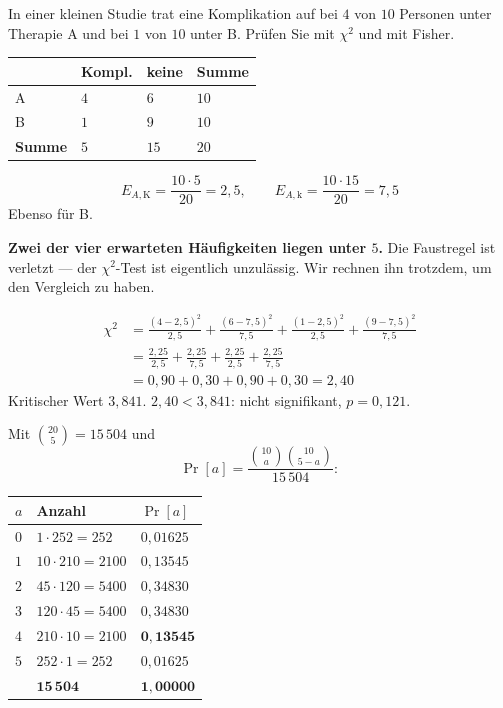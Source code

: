 \begin{aufgabe}
In einer kleinen Studie trat eine Komplikation auf bei $4$ von $10$ Personen unter Therapie A und bei $1$ von $10$ unter B. Prüfen Sie mit $\chi^2$ und mit Fisher.

\loesung
{}
\begin{center}
\renewcommand{\arraystretch}{1.45}
\begin{tabular}{@{}P{1.6cm}P{1.6cm}P{1.6cm}P{1.6cm}@{}}
\toprule
& \textbf{Kompl.} & \textbf{keine} & \textbf{Summe}\\
\midrule
A & $4$ & $6$ & $10$\\
B & $1$ & $9$ & $10$\\
\midrule
\textbf{Summe} & $5$ & $15$ & $20$\\
\bottomrule
\end{tabular}
\end{center}

\[ E_{A,\text{K}} = \frac{10 \cdot 5}{20} = 2{,}5, \qquad E_{A,\text{k}} = \frac{10 \cdot 15}{20} = 7{,}5 \]
Ebenso für B.

\textbf{Zwei der vier erwarteten Häufigkeiten liegen unter $5$.} Die Faustregel ist verletzt --- der $\chi^2$-Test ist eigentlich unzulässig. Wir rechnen ihn trotzdem, um den Vergleich zu haben.

\begin{align*}
\chi^2 &= \frac{(4-2{,}5)^2}{2{,}5} + \frac{(6-7{,}5)^2}{7{,}5} + \frac{(1-2{,}5)^2}{2{,}5} + \frac{(9-7{,}5)^2}{7{,}5}\\
&= \frac{2{,}25}{2{,}5} + \frac{2{,}25}{7{,}5} + \frac{2{,}25}{2{,}5} + \frac{2{,}25}{7{,}5}\\
&= 0{,}90 + 0{,}30 + 0{,}90 + 0{,}30 = 2{,}40
\end{align*}
Kritischer Wert $3{,}841$. $2{,}40 < 3{,}841$: nicht signifikant, $p = 0{,}121$.

Mit $\binom{20}{5} = 15\,504$ und
\[ \Pr[a] = \frac{\binom{10}{a}\binom{10}{5-a}}{15\,504} : \]
\begin{center}
{\small
\renewcommand{\arraystretch}{1.35}
\begin{tabular}{@{}P{1.0cm}P{2.6cm}P{1.8cm}@{}}
\toprule
$a$ & \textbf{Anzahl} & $\Pr[a]$\\
\midrule
$0$ & $1 \cdot 252 = 252$ & $0{,}01625$\\
$1$ & $10 \cdot 210 = 2100$ & $0{,}13545$\\
$2$ & $45 \cdot 120 = 5400$ & $0{,}34830$\\
$3$ & $120 \cdot 45 = 5400$ & $0{,}34830$\\
$4$ & $210 \cdot 10 = 2100$ & $\mathbf{0{,}13545}$\\
$5$ & $252 \cdot 1 = 252$ & $0{,}01625$\\
\midrule
& $\mathbf{15\,504}$ & $\mathbf{1{,}00000}$\\
\bottomrule
\end{tabular}}
\end{center}


\end{aufgabe}
